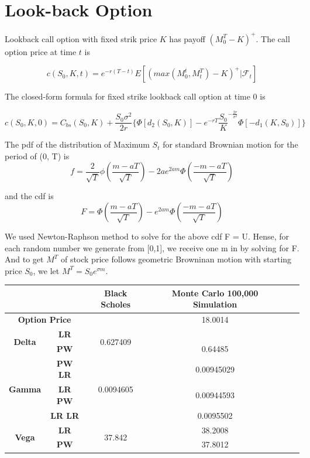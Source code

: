 \documentclass[11pt,a4paper,fleqn]{article}
\begin{document}
\section{Look-back Option}

Lookback call option with fixed strik price $K$ has payoff $(M^T_{0}-K)^+$. The call option price at time $t$ is

$$c(S_0,K,t) = e^{-r(T-t)}E[(max(M^t_0,M^T_t)-K)^+|\mathcal{F}_t] $$

The closed-form formula for fixed strike lookback call option at time 0 \cite{lectures} is

$$c(S_0,K,0)=C_{bs}(S_0,K) + \frac{S_0\sigma^2}{2r}\{ \Phi[d_2(S_0,K)]-e^{-rT}\frac{S_0}{K}^{-\frac{2r}{\sigma^2}} \Phi[-d_1(K,S_0)]\}$$


The pdf of the distribution of Maximum $S_t$ for standard Brownian motion for the period of (0, T) is
$$f = \frac{2}{\sqrt{T}}\phi\left(\frac{m-aT}{\sqrt{T}}\right)-2ae^{2am}\Phi\left(\frac{-m-aT}{\sqrt{T}}\right)$$

and the cdf is
$$F = \Phi\left(\frac{m-aT}{\sqrt{T}}\right)-e^{2am}\Phi\left(\frac{-m-aT}{\sqrt{T}}\right)$$

We used Newton-Raphson method to solve for the above cdf F = U. Hense, for each random number we generate from [0,1], we receive one m in by solving for F. And to get $M^T$ of stock price follows geometric Browninan motion with starting price $S_0$, we let $M^T=S_0e^{\sigma m }$.\\

\begin{tabular}{|c|c|c|c|c|c|}
\hline
\multicolumn{2}{|l|}{}             & \textbf{Black Scholes} & \textbf{Monte Carlo 100,000 Simulation} \\ \hline
\multicolumn{2}{|c|}{\textbf{Option Price}}      &  & 18.0014          \\ \hline
\multirow{2}{*}{\textbf{Delta}} & \textbf{LR}    & \multirow{2}{*}{0.627409}                &      \\ 
                                & \textbf{PW}    &                                          & 0.64485               \\ \hline
\multirow{3}{*}{\textbf{Gamma}} & \textbf{PW LR} & \multirow{3}{*}{0.0094605}                 & 0.00945029       \\ 
                                & \textbf{LR PW} &                                           & 0.00944593       \\
                                & \textbf{LR LR} &                                          & 0.0095502        \\ \hline
\multirow{2}{*}{\textbf{Vega}}  & \textbf{LR}    & \multirow{2}{*}{37.842} & 38.2008          \\ 
                                & \textbf{PW}    &                                             & 37.8012          \\ \hline
\end{tabular}\\
\end{document}
